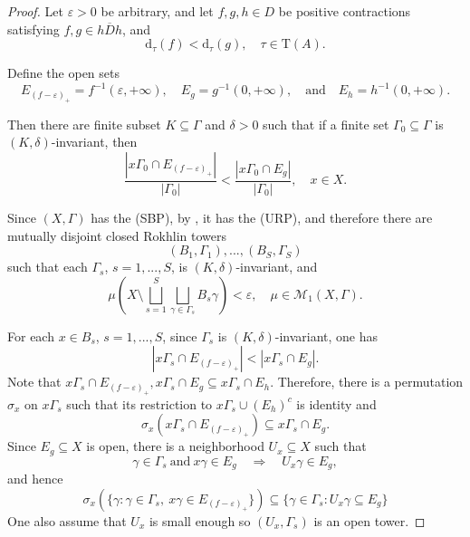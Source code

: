 \documentclass[12pt, oneside, psamsfonts]{amsart}
\theoremstyle{definition}
\theoremstyle{remark}
\numberwithin{equation}{section}
\newcommand{\abs}[1]{| #1 |}
\newcommand{\eps}{\varepsilon}
\newcommand{\tr}{\mathrm{T}}
\begin{document}
\begin{proof}
Let $\eps>0$ be arbitrary, and let $f, g, h \in D$ be positive contractions satisfying $f, g \in \overline{hDh}$, and $$\mathrm{d}_\tau(f) < \mathrm{d}_\tau(g),\quad \tau \in \tr(A).$$

Define the open sets
$$E_{(f-\eps)_+} = f^{-1}(\eps, +\infty),\quad E_g = g^{-1}(0, +\infty), \quad \mathrm{and} \quad E_h = h^{-1}(0, +\infty). $$

Then there are finite subset $ K \subseteq \Gamma$ and $\delta>0$ such that if a finite set $\Gamma_0 \subseteq \Gamma$ is $(K, \delta)$-invariant, then
$$ 
\frac{ \abs{x\Gamma_0 \cap E_{(f-\eps)_+}}}{\abs{\Gamma_0}} < \frac{ \abs{x\Gamma_0 \cap E_g}}{\abs{\Gamma_0}}, \quad x \in X.
$$

Since $(X, \Gamma)$ has the (SBP), by \cite{KS-comparison}, it has the (URP), and therefore there are mutually disjoint closed Rokhlin towers 
$$(B_1, \Gamma_1), ..., (B_S, \Gamma_S)$$
such that each $\Gamma_s$, $s=1, ..., S$, is $(K, \delta)$-invariant, and $$\mu(X \setminus \bigsqcup_{s=1}^S \bigsqcup_{\gamma\in \Gamma_s} B_s\gamma) < \eps,\quad \mu \in \mathcal M_1(X, \Gamma).$$

For each $x \in B_s$, $s=1, ..., S$,  since $\Gamma_s$ is $(K, \delta)$-invariant, one has
$$ \abs{x\Gamma_s \cap E_{(f-\eps)_+}} < \abs{x \Gamma_s \cap E_g}.$$ 
Note that $x\Gamma_s \cap E_{(f-\eps)_+}, x\Gamma_s \cap E_{g} \subseteq x\Gamma_s \cap E_{h}$. Therefore, there is a permutation $\sigma_x$ on $x\Gamma_s$ such that its restriction to $x\Gamma_s \cup (E_h)^c$ is identity and
$$\sigma_x(x\Gamma_s \cap E_{(f-\eps)_+}) \subseteq x\Gamma_s \cap E_{g}.$$ 
Since $E_g \subseteq X$ is open, there is a neighborhood $U_x \subseteq X$ such that 
$$ \gamma \in \Gamma_s\  \textrm{and}\  x\gamma \in E_{g}  \quad \Rightarrow \quad U_x \gamma \in E_{g},$$
and hence
$$\sigma_x(\{\gamma: \gamma \in \Gamma_s,\ x\gamma \in E_{(f-\eps)_+}\}) \subseteq \{\gamma \in \Gamma_s: U_x \gamma \subseteq E_{g}  \}$$
One also assume that $U_x$ is small enough so $(U_x, \Gamma_s)$ is an open tower.


\end{proof}
\end{document}
